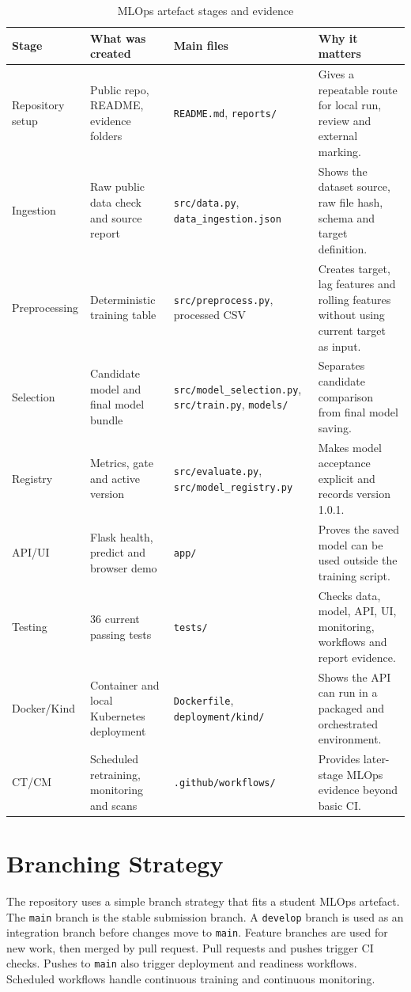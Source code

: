 \documentclass[journal,twoside,web]{ieeecolor}
\begin{document}
\begin{table}[!t]
\caption{MLOps artefact stages and evidence}
\label{tab:stages}
\centering
\scriptsize
\renewcommand{\arraystretch}{1.13}
\begin{tabular}{|L{0.72in}|L{1.25in}|L{1.45in}|L{3.0in}|}
\hline
\textbf{Stage} & \textbf{What was created} & \textbf{Main files} & \textbf{Why it matters} \\
\hline
Repository setup & Public repo, README, evidence folders & \texttt{README.md}, \texttt{reports/} & Gives a repeatable route for local run, review and external marking. \\
\hline
Ingestion & Raw public data check and source report & \texttt{src/data.py}, \texttt{data\_ingestion.json} & Shows the dataset source, raw file hash, schema and target definition. \\
\hline
Preprocessing & Deterministic training table & \texttt{src/preprocess.py}, processed CSV & Creates target, lag features and rolling features without using current target as input. \\
\hline
Selection & Candidate model and final model bundle & \texttt{src/model\_selection.py}, \texttt{src/train.py}, \texttt{models/} & Separates candidate comparison from final model saving. \\
\hline
Registry & Metrics, gate and active version & \texttt{src/evaluate.py}, \texttt{src/model\_registry.py} & Makes model acceptance explicit and records version 1.0.1. \\
\hline
API/UI & Flask health, predict and browser demo & \texttt{app/} & Proves the saved model can be used outside the training script. \\
\hline
Testing & 36 current passing tests & \texttt{tests/} & Checks data, model, API, UI, monitoring, workflows and report evidence. \\
\hline
Docker/Kind & Container and local Kubernetes deployment & \texttt{Dockerfile}, \texttt{deployment/kind/} & Shows the API can run in a packaged and orchestrated environment. \\
\hline
CT/CM & Scheduled retraining, monitoring and scans & \texttt{.github/workflows/} & Provides later-stage MLOps evidence beyond basic CI. \\
\hline
\end{tabular}
\end{table}

\section{Branching Strategy}
The repository uses a simple branch strategy that fits a student MLOps artefact. The \texttt{main} branch is the stable submission branch. A \texttt{develop} branch is used as an integration branch before changes move to \texttt{main}. Feature branches are used for new work, then merged by pull request. Pull requests and pushes trigger CI checks. Pushes to \texttt{main} also trigger deployment and readiness workflows. Scheduled workflows handle continuous training and continuous monitoring.
\end{document}
